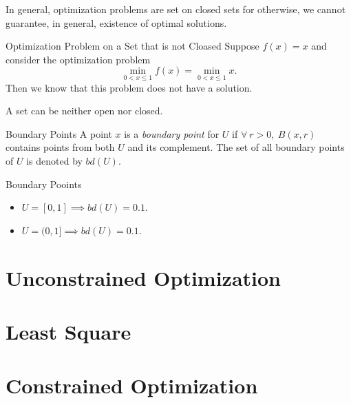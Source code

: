 \begin{rmk}
	In general, optimization problems are set on closed sets for otherwise, we cannot guarantee, in general, existence of optimal solutions. 	
\end{rmk}
\begin{eg}{Optimization Problem on a Set that is not Cloased}
	Suppose $f(x)=x$ and consider the optimization problem \[\min_{0<x\leq1}f(x)=\min_{0<x\leq1}x.\] Then we know that this problem does not have a solution.
\end{eg}
\begin{rmk}
	A set can be neither open nor closed.	
\end{rmk}
\begin{df}{Boundary Points}
	A point $x$ is a \textit{boundary point} for $U$ if $\forall\ r>0,\ B(x,r)$ contains points from both $U$ and its complement. The set of all boundary points of $U$ is denoted by $bd(U)$.
\end{df}
\begin{eg}{Boundary Pooints}
	\begin{itemize}
		\item $U=[0,1]\implies bd(U)=\qty{0,1}$.
		\item $U=(0,1]\implies bd(U)=\qty{0,1}$.
	\end{itemize}	
\end{eg}





\newpage
\section{Unconstrained Optimization}

\newpage
\section{Least Square}

\newpage
\section{Constrained Optimization}

